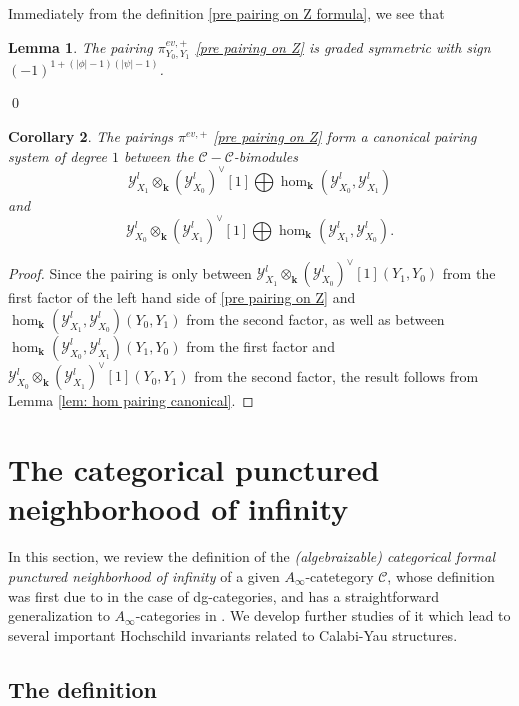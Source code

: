 \documentclass[11pt]{amsproc}
\def\K{{\mathbf{k}}}
\def\Y{\mathcal{Y}}
\def\cc{\mathcal{C}}
\def\ainf{A_\infty}
\newtheorem{lem}{Lemma}[section]
\newtheorem{cor}[lem]{Corollary}
\theoremstyle{remark}
\numberwithin{equation}{section}
\begin{document}
Immediately from the definition \eqref{pre pairing on Z formula}, we see that

\begin{lem}\label{lem: Z pairing symmetric}
The pairing $\pi^{ev, +}_{Y_{0}, Y_{1}}$ \eqref{pre pairing on Z} is graded symmetric with sign $(-1)^{1+(|\phi|-1)(|\psi|-1)}$.
\end{lem} \qed

\begin{cor}\label{cor: Z pairing canonical}
The pairings $\pi^{ev, +}$ \eqref{pre pairing on Z} form a canonical pairing system of degree $1$ between the $\cc-\cc$-bimodules 
\[
\Y^{l}_{X_{1}} \otimes_{\K} (\Y^{l}_{X_{0}})^{\vee}[1] \bigoplus \hom_{\K}(\Y^{l}_{X_{0}}, \Y^{l}_{X_{1}})
\]
 and 
 \[
\Y^{l}_{X_{0}} \otimes_{\K} (\Y^{l}_{X_{1}})^{\vee}[1] \bigoplus \hom_{\K}(\Y^{l}_{X_{1}}, \Y^{l}_{X_{0}}).
 \]
\end{cor}
\begin{proof}
Since the pairing is only between $\Y^{l}_{X_{1}} \otimes_{\K} (\Y^{l}_{X_{0}})^{\vee}[1](Y_{1}, Y_{0})$ from the first factor of the left hand side of \eqref{pre pairing on Z} and $\hom_{\K}(\Y^{l}_{X_{1}}, \Y^{l}_{X_{0}})(Y_{0}, Y_{1})$ from the second factor,
as well as between $\hom_{\K}(\Y^{l}_{X_{0}}, \Y^{l}_{X_{1}})(Y_{1}, Y_{0})$ from the first factor and $\Y^{l}_{X_{0}} \otimes_{\K} (\Y^{l}_{X_{1}})^{\vee}[1](Y_{0}, Y_{1})$ from the second factor,
the result follows from Lemma \ref{lem: hom pairing canonical}.
\end{proof}

\section{The categorical punctured neighborhood of infinity}\label{section: neighborhood of infinity}

In this section, we review the definition of the {\it (algebraizable) categorical formal punctured neighborhood of infinity} of a given $\ainf$-catetegory $\cc$,
whose definition was first due to \cite{efimov2} in the case of dg-categories,
and has a straightforward generalization to $\ainf$-categories in \cite{GGV}.
We develop further studies of it which lead to several important Hochschild invariants related to Calabi-Yau structures.

\subsection{The definition}
\end{document}
